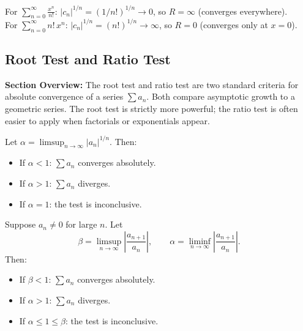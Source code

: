 \documentclass[../master/master.tex]{subfiles}
\begin{document}
\begin{example}
For $\sum_{n=0}^{\infty} \frac{x^n}{n!}$: $|c_n|^{1/n} = (1/n!)^{1/n} \to 0$, so $R = \infty$ (converges everywhere). \\
For $\sum_{n=0}^{\infty} n!\, x^n$: $|c_n|^{1/n} = (n!)^{1/n} \to \infty$, so $R = 0$ (converges only at $x = 0$).
\end{example}

\subsection{Root Test and Ratio Test}

\begin{summarybox}
\textbf{Section Overview:} The root test and ratio test are two standard criteria for absolute convergence of a series $\sum a_n$. Both compare asymptotic growth to a geometric series. The root test is strictly more powerful; the ratio test is often easier to apply when factorials or exponentials appear.
\end{summarybox}

\begin{theorem}
Let $\alpha = \limsup_{n \to \infty} |a_n|^{1/n}$. Then:
\begin{itemize}
    \item If $\alpha < 1$: $\sum a_n$ converges absolutely.
    \item If $\alpha > 1$: $\sum a_n$ diverges.
    \item If $\alpha = 1$: the test is inconclusive.
\end{itemize}
\end{theorem}

\begin{theorem}
Suppose $a_n \neq 0$ for large $n$. Let
\[
    \beta = \limsup_{n \to \infty} \left|\frac{a_{n+1}}{a_n}\right|, \qquad \alpha = \liminf_{n \to \infty} \left|\frac{a_{n+1}}{a_n}\right|.
\]
Then:
\begin{itemize}
    \item If $\beta < 1$: $\sum a_n$ converges absolutely.
    \item If $\alpha > 1$: $\sum a_n$ diverges.
    \item If $\alpha \leq 1 \leq \beta$: the test is inconclusive.
\end{itemize}
\end{theorem}
\end{document}
